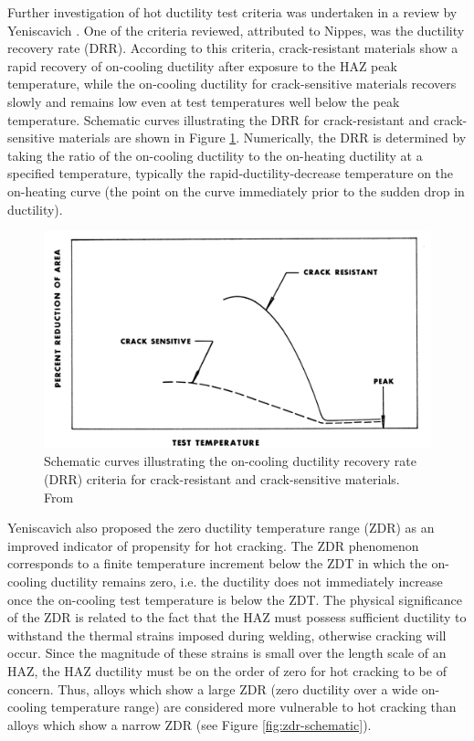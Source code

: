 Further investigation of hot ductility test criteria was undertaken in a review by Yeniscavich \cite{yeniscavich_correlation_1970}. One of the criteria reviewed, attributed to Nippes, was the ductility recovery rate (DRR). According to this criteria, crack-resistant materials show a rapid recovery of on-cooling ductility after exposure to the HAZ peak temperature, while the on-cooling ductility for crack-sensitive materials recovers slowly and remains low even at test temperatures well below the peak temperature. Schematic curves illustrating the DRR for crack-resistant and crack-sensitive materials are shown in Figure \ref{fig:drr-schematic}. Numerically, the DRR is determined by taking the ratio of the on-cooling ductility to the on-heating ductility at a specified temperature, typically the rapid-ductility-decrease temperature on the on-heating curve (the point on the curve immediately prior to the sudden drop in ductility).

\begin{figure}
\centering
\includegraphics[width=6.5in]{figures/yeniscavich-drr.png}
\caption{Schematic curves illustrating the on-cooling ductility recovery rate (DRR) criteria for crack-resistant and crack-sensitive materials.  From \citet[Fig.~2]{yeniscavich_correlation_1970}}
\label{fig:drr-schematic}
\end{figure}

Yeniscavich also proposed the zero ductility temperature range (ZDR) as an improved indicator of propensity for hot cracking. The ZDR phenomenon corresponds to a finite temperature increment below the ZDT in which the on-cooling ductility remains zero, i.e. the ductility does not immediately increase once the on-cooling test temperature is below the ZDT. The physical significance of the ZDR is related to the fact that the HAZ must possess sufficient ductility to withstand the thermal strains imposed during welding, otherwise cracking will occur. Since the magnitude of these strains is small over the length scale of an HAZ, the HAZ ductility must be on the order of zero for hot cracking to be of concern. Thus, alloys which show a large ZDR (zero ductility over a wide on-cooling temperature range) are considered more vulnerable to hot cracking than alloys which show a narrow ZDR (see Figure \ref{fig:zdr-schematic}).

